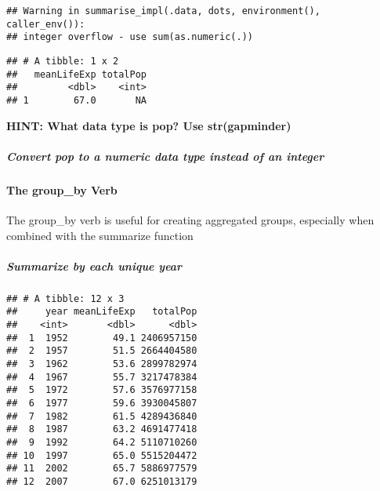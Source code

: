 \documentclass[]{article}
\newenvironment{Shaded}{\begin{snugshade}}{\end{snugshade}}
\newcommand{\KeywordTok}[1]{\textcolor[rgb]{0.13,0.29,0.53}{\textbf{#1}}}
\newcommand{\DataTypeTok}[1]{\textcolor[rgb]{0.13,0.29,0.53}{#1}}
\newcommand{\StringTok}[1]{\textcolor[rgb]{0.31,0.60,0.02}{#1}}
\newcommand{\OperatorTok}[1]{\textcolor[rgb]{0.81,0.36,0.00}{\textbf{#1}}}
\newcommand{\NormalTok}[1]{#1}
\let\oldparagraph\paragraph
\renewcommand{\paragraph}[1]{\oldparagraph{#1}\mbox{}}
\let\oldsubparagraph\subparagraph
\renewcommand{\subparagraph}[1]{\oldsubparagraph{#1}\mbox{}}
\begin{document}
\begin{verbatim}
## Warning in summarise_impl(.data, dots, environment(), caller_env()):
## integer overflow - use sum(as.numeric(.))
\end{verbatim}

\begin{verbatim}
## # A tibble: 1 x 2
##   meanLifeExp totalPop
##         <dbl>    <int>
## 1        67.0       NA
\end{verbatim}

\textbf{HINT: What data type is pop? Use str(gapminder)}

\subparagraph{Convert pop to a numeric data type instead of an
integer}\label{convert-pop-to-a-numeric-data-type-instead-of-an-integer}

\begin{Shaded}
\end{Shaded}

\paragraph{The group\_by Verb}\label{the-group_by-verb}

The group\_by verb is useful for creating aggregated groups, especially
when combined with the summarize function

\subparagraph{Summarize by each unique
year}\label{summarize-by-each-unique-year}

\begin{Shaded}
\end{Shaded}

\begin{verbatim}
## # A tibble: 12 x 3
##     year meanLifeExp   totalPop
##    <int>       <dbl>      <dbl>
##  1  1952        49.1 2406957150
##  2  1957        51.5 2664404580
##  3  1962        53.6 2899782974
##  4  1967        55.7 3217478384
##  5  1972        57.6 3576977158
##  6  1977        59.6 3930045807
##  7  1982        61.5 4289436840
##  8  1987        63.2 4691477418
##  9  1992        64.2 5110710260
## 10  1997        65.0 5515204472
## 11  2002        65.7 5886977579
## 12  2007        67.0 6251013179
\end{verbatim}
\end{document}
